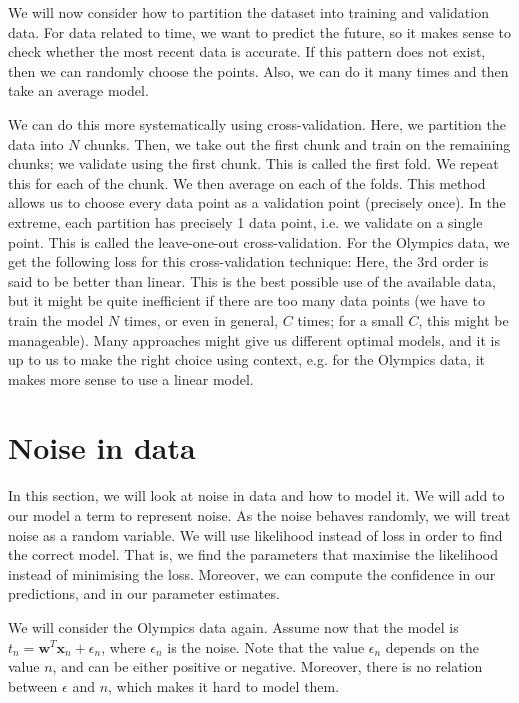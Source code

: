 \documentclass[a4paper, openany]{memoir}
\begin{document}
    We will now consider how to partition the dataset into training and validation data. For data related to time, we want to predict the future, so it makes sense to check whether the most recent data is accurate. If this pattern does not exist, then we can randomly choose the points. Also, we can do it many times and then take an average model.

    We can do this more systematically using cross-validation. Here, we partition the data into $N$ chunks. Then, we take out the first chunk and train on the remaining chunks; we validate using the first chunk. This is called the first fold. We repeat this for each of the chunk. We then average on each of the folds. This method allows us to choose every data point as a validation point (precisely once). In the extreme, each partition has precisely 1 data point, i.e. we validate on a single point. This is called the leave-one-out cross-validation. For the Olympics data, we get the following loss for this cross-validation technique:
    Here, the 3rd order is said to be better than linear. This is the best possible use of the available data, but it might be quite inefficient if there are too many data points (we have to train the model $N$ times, or even in general, $C$ times; for a small $C$, this might be manageable). Many approaches might give us different optimal models, and it is up to us to make the right choice using context, e.g. for the Olympics data, it makes more sense to use a linear model.
    \newpage

    \section{Noise in data}
    In this section, we will look at noise in data and how to model it. We will add to our model a term to represent noise. As the noise behaves randomly, we will treat noise as a random variable. We will use likelihood instead of loss in order to find the correct model. That is, we find the parameters that maximise the likelihood instead of minimising the loss. Moreover, we can compute the confidence in our predictions, and in our parameter estimates.

    We will consider the Olympics data again. Assume now that the model is $t_n = \mathbf{w}^T \mathbf{x}_n + \epsilon_n$, where $\epsilon_n$ is the noise. Note that the value $\epsilon_n$ depends on the value $n$, and can be either positive or negative. Moreover, there is no relation between $\epsilon$ and $n$, which makes it hard to model them.
\end{document}
